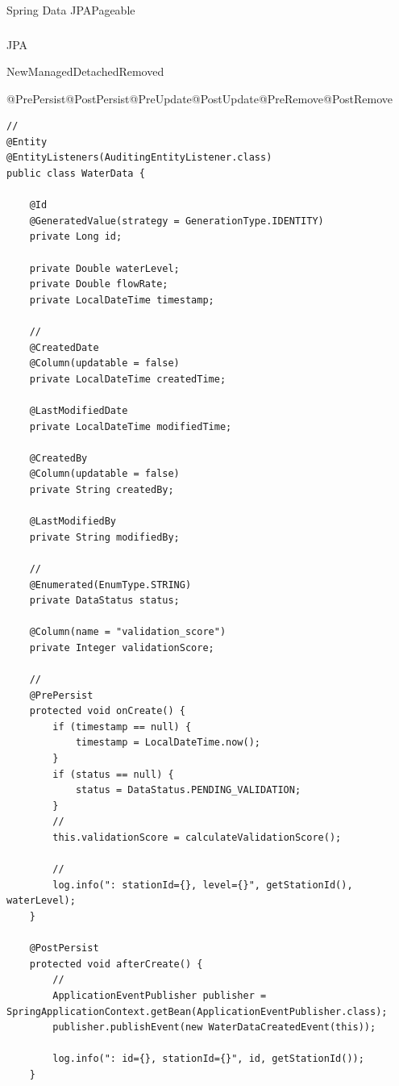 \important{}Spring Data JPAPageable

\hypertarget{section-62}{%
\subsubsection{}\label{section-62}}

JPA

\important{}NewManagedDetachedRemoved

\important{}@PrePersist@PostPersist@PreUpdate@PostUpdate@PreRemove@PostRemove

\begin{lstlisting}[style=java]
// 
@Entity
@EntityListeners(AuditingEntityListener.class)
public class WaterData {
    
    @Id
    @GeneratedValue(strategy = GenerationType.IDENTITY)
    private Long id;
    
    private Double waterLevel;
    private Double flowRate;
    private LocalDateTime timestamp;
    
    // 
    @CreatedDate
    @Column(updatable = false)
    private LocalDateTime createdTime;
    
    @LastModifiedDate
    private LocalDateTime modifiedTime;
    
    @CreatedBy
    @Column(updatable = false)
    private String createdBy;
    
    @LastModifiedBy
    private String modifiedBy;
    
    // 
    @Enumerated(EnumType.STRING)
    private DataStatus status;
    
    @Column(name = "validation_score")
    private Integer validationScore;
    
    // 
    @PrePersist
    protected void onCreate() {
        if (timestamp == null) {
            timestamp = LocalDateTime.now();
        }
        if (status == null) {
            status = DataStatus.PENDING_VALIDATION;
        }
        // 
        this.validationScore = calculateValidationScore();
        
        // 
        log.info(": stationId={}, level={}", getStationId(), waterLevel);
    }
    
    @PostPersist
    protected void afterCreate() {
        // 
        ApplicationEventPublisher publisher = SpringApplicationContext.getBean(ApplicationEventPublisher.class);
        publisher.publishEvent(new WaterDataCreatedEvent(this));
        
        log.info(": id={}, stationId={}", id, getStationId());
    }
    

\end{lstlisting}
